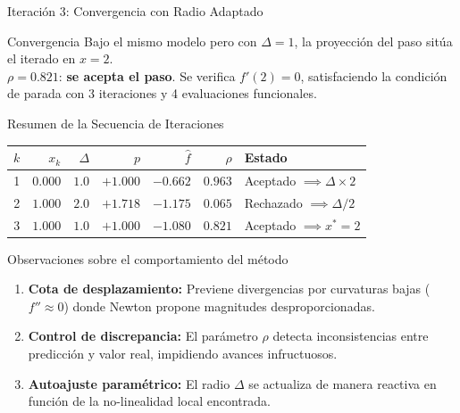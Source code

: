 \begin{frame}{Iteración 3: Convergencia con Radio Adaptado}
    \vspace{0.3em}
    \begin{exampleblock}{Convergencia}
        \scriptsize
        Bajo el mismo modelo pero con \(\Delta=1\), la proyección del paso sitúa el iterado en \(x=2\).
        \\[0.2em]
        \(\rho = 0.821\): \textcolor{VerdeNeon}{\textbf{se acepta el paso}}.
        Se verifica \(f'(2)=0\), satisfaciendo la condición de parada con 3 iteraciones y 4 evaluaciones funcionales.
    \end{exampleblock}
\end{frame}

\begin{frame}{Resumen de la Secuencia de Iteraciones}
    \begin{center}
    \small
    \begin{tabular}{c r r r r r l}
        \toprule
        \(k\) & \(x_k\) & \(\Delta\) & \(p\) & \(\hat f\) & \(\rho\) & Estado \\
        \midrule
        1 & $0.000$ & $1.0$ & \(+1.000\) & \(-0.662\) & $0.963$
          & \textcolor{VerdeNeon}{Aceptado} \(\implies \Delta \times 2\) \\
        2 & $1.000$ & $2.0$ & \(+1.718\) & \(-1.175\) & $0.065$
          & \textcolor{RojoAlerta}{Rechazado} \(\implies \Delta / 2\) \\
        3 & $1.000$ & $1.0$ & \(+1.000\) & \(-1.080\) & $0.821$
          & \textcolor{VerdeNeon}{Aceptado} \(\implies x^{*}=2\) \\
        \bottomrule
    \end{tabular}
    \end{center}

    \vspace{0.6em}
    \begin{block}{Observaciones sobre el comportamiento del método}
        \footnotesize
        \begin{enumerate}
            \item \textbf{Cota de desplazamiento:} Previene divergencias por curvaturas bajas (\(f'' \approx 0\)) donde Newton propone magnitudes desproporcionadas.
            \item \textbf{Control de discrepancia:} El parámetro \(\rho\) detecta inconsistencias entre predicción y valor real, impidiendo avances infructuosos.
            \item \textbf{Autoajuste paramétrico:} El radio \(\Delta\) se actualiza de manera reactiva en función de la no-linealidad local encontrada.
        \end{enumerate}
    \end{block}
\end{frame}

